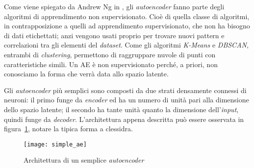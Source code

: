 Come viene spiegato da Andrew Ng in \cite{ng_sparse_ae}, gli \textit{autoencoder} fanno parte degli algoritmi di apprendimento non supervisionato.
Cioè di quella classe di algoritmi, in contrapposizione a quelli ad apprendimento supervisionato, che non ha bisogno di dati etichettati; anzi vengono usati proprio per trovare nuovi pattern e correlazioni tra gli elementi del \textit{dataset}.
Come gli algoritmi \textit{K-Means} e \textit{DBSCAN}, entrambi di \textit{clustering}, permettono di raggruppare nuvole di punti con caratteristiche simili. %
Un AE è non supervisionato perché, a priori, non conosciamo la forma che verrà data allo spazio latente. %

Gli \textit{autoencoder} più semplici sono composti da due strati densamente connessi di neuroni: il primo funge da \textit{encoder} ed ha un numero di unità pari alla dimensione dello spazio latente; il secondo ha tante unità quanto la dimensione dell'\textit{input}, quindi funge da \textit{decoder}.
L'architettura appena descritta può essere osservata in figura~\ref{fig:semplice_ae}, notare la tipica forma a clessidra.

\begin{figure}[ht] %
  \begin{center}
    \centering\texttt{[image: simple\_ae]}
  \end{center}
  \caption{Architettura di un semplice \textit{autoencoder}}
  \label{fig:semplice_ae}
\end{figure}


